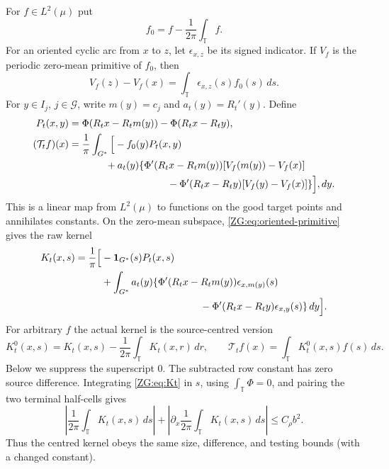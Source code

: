 \documentclass[11pt]{amsart}
\numberwithin{equation}{section}
\theoremstyle{definition}
\theoremstyle{remark}
\newcommand{\T}{\mathbb T}
\begin{document}
For $f\in L^2(\mu)$ put
\[
 f_0=f-\frac1{2\pi}\int_\T f.
\]
For an oriented cyclic arc from $x$ to $z$, let
$\epsilon_{x,z}$ be its signed indicator.  If $V_f$ is the periodic
zero-mean primitive of $f_0$, then
\begin{equation}\label{ZG:eq:oriented-primitive}
 V_f(z)-V_f(x)=\int_\T\epsilon_{x,z}(s)f_0(s)\,ds.
\end{equation}
For $y\in I_j$, $j\in\mathcal G$, write $m(y)=c_j$ and
$a_t(y)=R_t'(y)$.  Define
\begin{align}
 P_t(x,y)&=\Phi(R_t x-R_t m(y))-\Phi(R_t x-R_t y),
 \label{ZG:eq:Pt}\\
 (\mathcal T_tf)(x)
 &=\frac1\pi\int_{G^*}
 \Big[-f_0(y)P_t(x,y)\notag\\
 &\hspace{13mm}+a_t(y)\{\Phi'(R_tx-R_tm(y))
       [V_f(m(y))-V_f(x)]\notag\\
 &\hspace{35mm}-\Phi'(R_tx-R_ty)
       [V_f(y)-V_f(x)]\}\Big],dy .
 \label{ZG:eq:Tt}
\end{align}
This is a linear map from $L^2(\mu)$ to functions on the good target
points and annihilates constants.  On the zero-mean subspace,
\eqref{ZG:eq:oriented-primitive} gives the raw kernel
\begin{align}
 K_t(x,s)=\frac1\pi\Big[&-\mathbf1_{G^*}(s)P_t(x,s)
 \notag\\
 &+\int_{G^*}a_t(y)
 \{\Phi'(R_tx-R_tm(y))\epsilon_{x,m(y)}(s)\notag\\
 &\hspace{35mm}-\Phi'(R_tx-R_ty)\epsilon_{x,y}(s)\}\,dy\Big].
 \label{ZG:eq:Kt}
\end{align}
For arbitrary $f$ the actual kernel is the source-centred version
\begin{equation}\label{ZG:eq:Kt-centred}
 K_t^0(x,s)=K_t(x,s)-\frac1{2\pi}\int_\T K_t(x,r)\,dr,
 \qquad
 \mathcal T_tf(x)=\int_\T K_t^0(x,s)f(s)\,ds.
\end{equation}
Below we suppress the superscript $0$.  The subtracted row constant has
zero source difference.  Integrating \eqref{ZG:eq:Kt} in $s$, using
$\int_\T\Phi=0$, and pairing the two terminal half-cells gives
\begin{equation}\label{ZG:eq:row-gauge}
 \left|\frac1{2\pi}\int_\T K_t(x,s)\,ds\right|
 +\left|\partial_x\frac1{2\pi}\int_\T K_t(x,s)\,ds\right|
 \le C_\rho b^2.
\end{equation}
Thus the centred kernel obeys the same size, difference, and testing
bounds (with a changed constant).
\end{document}
